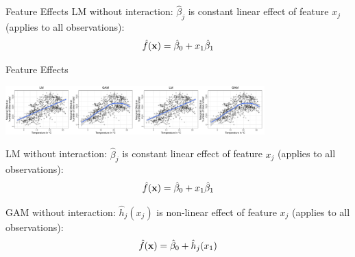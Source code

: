 \documentclass[11pt,compress,t,notes=noshow, aspectratio=169, xcolor=table]{beamer}
\begin{document}
\begin{frame}{Feature Effects}
LM without interaction: $\hat\beta_j$ is constant linear effect of feature $x_j$ (applies to all observations):
$$\fh(\xv) = \hat\beta_0 + x_1\hat\beta_1$$ %


\end{frame}


\begin{frame}{Feature Effects}

\centering

\includegraphics[width=0.375\textwidth, trim=0cm 0.1cm 10.4cm 0cm, clip]{figure/lm_main_effects}\includegraphics[width=0.375\textwidth, trim=10cm 0.1cm 0.4cm 0cm, clip]{figure/lm_main_effects}

LM without interaction: $\hat\beta_j$ is constant linear effect of feature $x_j$ (applies to all observations):
$$\fh(\xv) = \hat\beta_0 + x_1\hat\beta_1$$%

GAM without interaction: $\hat{h}_j(x_j)$ is non-linear effect of feature $x_j$  (applies to all observations):
$$\fh(\xv) = \hat\beta_0 + \hat{h}_j(x_1)$$%

\end{frame}
\end{document}
